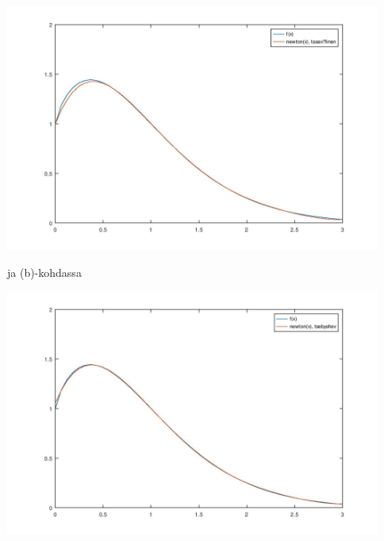 \documentclass{article}
\begin{document}
\includegraphics[width=350pt]{w4_5a.jpg}

ja (b)-kohdassa

\includegraphics[width=350pt]{w4_5b.jpg}
\end{document}
